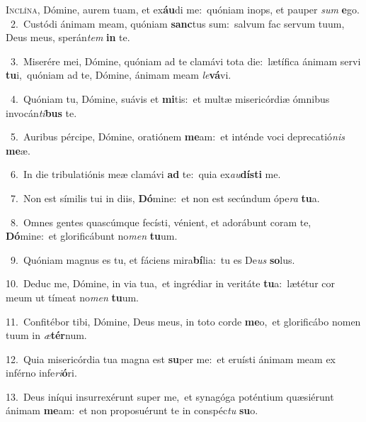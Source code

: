 \lettrine{\initial\textcolor{\initialcolor}{I}}{nclína,} Dómine, aurem tuam, et ex\-\textbf{áu}\-di me:~\star quóniam inops, et pauper \textit{sum} \textbf{e}\-go.\\
{\numbfont\textcolor{\numbcolor}{~2.}}~Custódi ánimam meam, quóniam \textbf{sanc}\-tus sum:~\star salvum fac servum tuum, Deus meus, sperán\textit{tem} \textbf{in} te.\par
{\numbfont\textcolor{\numbcolor}{~3.}}~Miserére mei, Dómine, quóniam ad te clamávi tota die:~\dagger lætífica ánimam servi \textbf{tu}\-i,~\star quóniam ad te, Dómine, ánimam meam \textit{le}\-\textbf{vá}vi.\par
{\numbfont\textcolor{\numbcolor}{~4.}}~Quóniam tu, Dómine, suávis et \textbf{mi}\-tis:~\star et multæ misericórdiæ ómnibus invocán\-\textit{ti}\-\textbf{bus} te.\par
{\numbfont\textcolor{\numbcolor}{~5.}}~Auribus pércipe, Dómine, oratiónem \textbf{me}\-am:~\star et inténde voci deprecatió\textit{nis} \textbf{me}\-æ.\par
{\numbfont\textcolor{\numbcolor}{~6.}}~In die tribulatiónis meæ clamávi \textbf{ad} te:~\star quia ex\-\textit{au}\-\textbf{dís}\textbf{ti} me.\par
{\numbfont\textcolor{\numbcolor}{~7.}}~Non est símilis tui in diis, \textbf{Dó}\-mine:~\star et non est secúndum ópe\textit{ra} \textbf{tu}\-a.\par
{\numbfont\textcolor{\numbcolor}{~8.}}~Omnes gentes quascúmque fecísti, vénient, et adorábunt coram te, \textbf{Dó}\-mine:~\star et glorificábunt no\textit{men} \textbf{tu}\-um.\par
{\numbfont\textcolor{\numbcolor}{~9.}}~Quóniam magnus es tu, et fáciens mira\-\textbf{bí}\-lia:~\star tu es De\textit{us} \textbf{so}\-lus.\par
{\numbfont\textcolor{\numbcolor}{10.}}~Deduc me, Dómine, in via tua,~\dagger et ingrédiar in veritáte \textbf{tu}\-a:~\star lætétur cor meum ut tímeat no\textit{men} \textbf{tu}\-um.\par
{\numbfont\textcolor{\numbcolor}{11.}}~Confitébor tibi, Dómine, Deus meus, in toto corde \textbf{me}\-o,~\star et glorificábo nomen tuum in \textit{æ}\-\textbf{tér}num.\par
{\numbfont\textcolor{\numbcolor}{12.}}~Quia misericórdia tua magna est \textbf{su}\-per me:~\star et eruísti ánimam meam ex inférno infe\-\textit{ri}\-\textbf{ó}ri.\par
{\numbfont\textcolor{\numbcolor}{13.}}~Deus iníqui insurrexérunt super me,~\dagger et synagóga poténtium quæsiérunt ánimam \textbf{me}\-am:~\star et non proposuérunt te in conspéc\textit{tu} \textbf{su}\-o.\par
